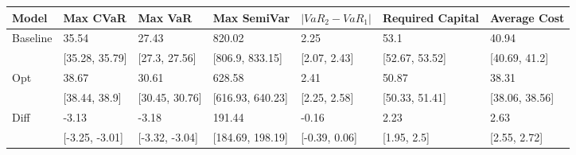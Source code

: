 \begin{tabular}{lllllll}
\toprule
   Model &       Max CVaR &        Max VaR &      Max SemiVar & $|VaR_2 - VaR_1|$ & Required Capital &   Average Cost \\
\midrule
Baseline &          35.54 &          27.43 &           820.02 &              2.25 &             53.1 &          40.94 \\
         & [35.28, 35.79] &  [27.3, 27.56] &  [806.9, 833.15] &      [2.07, 2.43] &   [52.67, 53.52] &  [40.69, 41.2] \\
     Opt &          38.67 &          30.61 &           628.58 &              2.41 &            50.87 &          38.31 \\
         &  [38.44, 38.9] & [30.45, 30.76] & [616.93, 640.23] &      [2.25, 2.58] &   [50.33, 51.41] & [38.06, 38.56] \\
    Diff &          -3.13 &          -3.18 &           191.44 &             -0.16 &             2.23 &           2.63 \\
         & [-3.25, -3.01] & [-3.32, -3.04] & [184.69, 198.19] &     [-0.39, 0.06] &      [1.95, 2.5] &   [2.55, 2.72] \\
\bottomrule
\end{tabular}
